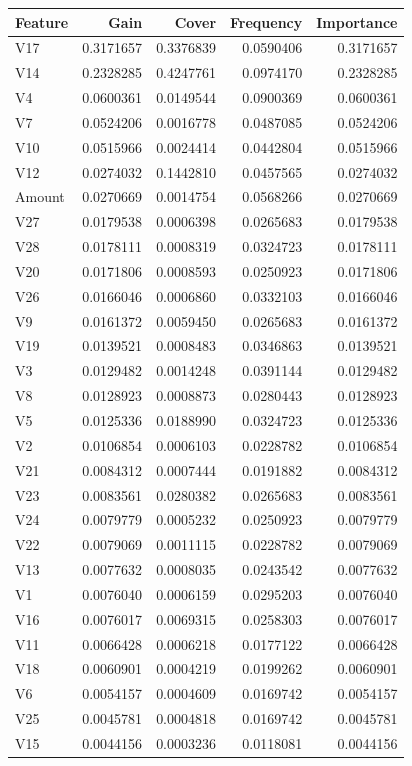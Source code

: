 \documentclass[]{article}
\begin{document}
\begin{table}[H]
\centering\begingroup\fontsize{10}{12}\selectfont

\begin{tabular}{l|r|r|r|r}
\hline
Feature & Gain & Cover & Frequency & Importance\\
\hline
V17 & 0.3171657 & 0.3376839 & 0.0590406 & 0.3171657\\
\hline
V14 & 0.2328285 & 0.4247761 & 0.0974170 & 0.2328285\\
\hline
V4 & 0.0600361 & 0.0149544 & 0.0900369 & 0.0600361\\
\hline
V7 & 0.0524206 & 0.0016778 & 0.0487085 & 0.0524206\\
\hline
V10 & 0.0515966 & 0.0024414 & 0.0442804 & 0.0515966\\
\hline
V12 & 0.0274032 & 0.1442810 & 0.0457565 & 0.0274032\\
\hline
Amount & 0.0270669 & 0.0014754 & 0.0568266 & 0.0270669\\
\hline
V27 & 0.0179538 & 0.0006398 & 0.0265683 & 0.0179538\\
\hline
V28 & 0.0178111 & 0.0008319 & 0.0324723 & 0.0178111\\
\hline
V20 & 0.0171806 & 0.0008593 & 0.0250923 & 0.0171806\\
\hline
V26 & 0.0166046 & 0.0006860 & 0.0332103 & 0.0166046\\
\hline
V9 & 0.0161372 & 0.0059450 & 0.0265683 & 0.0161372\\
\hline
V19 & 0.0139521 & 0.0008483 & 0.0346863 & 0.0139521\\
\hline
V3 & 0.0129482 & 0.0014248 & 0.0391144 & 0.0129482\\
\hline
V8 & 0.0128923 & 0.0008873 & 0.0280443 & 0.0128923\\
\hline
V5 & 0.0125336 & 0.0188990 & 0.0324723 & 0.0125336\\
\hline
V2 & 0.0106854 & 0.0006103 & 0.0228782 & 0.0106854\\
\hline
V21 & 0.0084312 & 0.0007444 & 0.0191882 & 0.0084312\\
\hline
V23 & 0.0083561 & 0.0280382 & 0.0265683 & 0.0083561\\
\hline
V24 & 0.0079779 & 0.0005232 & 0.0250923 & 0.0079779\\
\hline
V22 & 0.0079069 & 0.0011115 & 0.0228782 & 0.0079069\\
\hline
V13 & 0.0077632 & 0.0008035 & 0.0243542 & 0.0077632\\
\hline
V1 & 0.0076040 & 0.0006159 & 0.0295203 & 0.0076040\\
\hline
V16 & 0.0076017 & 0.0069315 & 0.0258303 & 0.0076017\\
\hline
V11 & 0.0066428 & 0.0006218 & 0.0177122 & 0.0066428\\
\hline
V18 & 0.0060901 & 0.0004219 & 0.0199262 & 0.0060901\\
\hline
V6 & 0.0054157 & 0.0004609 & 0.0169742 & 0.0054157\\
\hline
V25 & 0.0045781 & 0.0004818 & 0.0169742 & 0.0045781\\
\hline
V15 & 0.0044156 & 0.0003236 & 0.0118081 & 0.0044156\\
\hline
\end{tabular}
\endgroup{}
\end{table}
\end{document}
